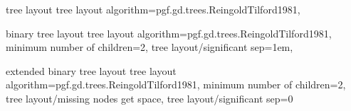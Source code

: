 %
%
\pgfgddeclarealgorithmkey
  {tree layout}
  {tree layout}
  {
    algorithm=pgf.gd.trees.ReingoldTilford1981,
  }

%
%
\pgfgddeclarealgorithmkey
  {binary tree layout}
  {tree layout}
  {
    algorithm=pgf.gd.trees.ReingoldTilford1981,
    minimum number of children=2,
    tree layout/significant sep=1em,
  }

%
%
\pgfgddeclarealgorithmkey
  {extended binary tree layout}
  {tree layout}
  {
    algorithm=pgf.gd.trees.ReingoldTilford1981,
    minimum number of children=2,
    tree layout/missing nodes get space,
    tree layout/significant sep=0
  }





\endinput
